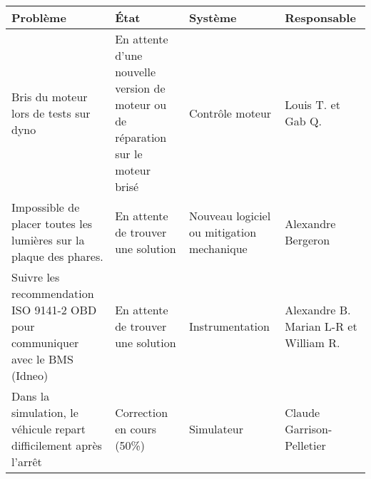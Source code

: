\begin{tabularx}{\linewidth}{
    |>{\hsize=1.5\hsize}X|%
    >{\hsize=0.5\hsize}X|%
    >{\hsize=0.5\hsize}X|%
    >{\hsize=0.5\hsize}X|%
  }
    \hline
    \textbf{Problème} & \textbf{État} & \textbf{Système} & \textbf{Responsable}\\\hline
    Bris du moteur lors de tests sur dyno & En attente d'une nouvelle version de moteur ou de réparation sur le moteur brisé & Contrôle moteur & Louis T. et Gab Q.\\\hline
   Impossible de placer toutes les lumières sur la plaque des phares. & En attente de trouver une solution & Nouveau logiciel ou mitigation mechanique & Alexandre Bergeron \\\hline %
   Suivre les recommendation ISO 9141-2 OBD pour communiquer avec le BMS (Idneo) & En attente de trouver une solution & Instrumentation & Alexandre B. Marian L-R et William R.\\\hline %
   Dans la simulation, le véhicule repart difficilement après l'arrêt & Correction en cours (50\%) & Simulateur & Claude Garrison-Pelletier\\\hline %
  \end{tabularx}
    
    
